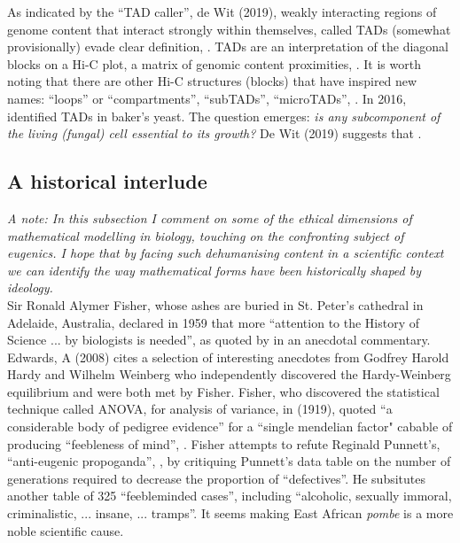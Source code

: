 As indicated by the ``TAD caller'', de Wit (2019), 
weakly interacting regions of genome content that interact strongly within themselves,
called TADs (somewhat provisionally) evade clear definition, \cite{de2020tads}.
TADs are an interpretation of the diagonal blocks on a Hi-C plot, a matrix of genomic 
content proximities, \cite{de2020tads}. It is worth noting that there are 
other Hi-C structures (blocks) that have inspired new names: ``loops'' or ``compartments'', ``subTADs'',
``microTADs'', \cite{beagan2020existence}. In 2016, \cite{eser2017form} identified TADs 
in baker's yeast. The question emerges: \textit{is any subcomponent of the living (fungal) cell essential to its
growth? } De Wit (2019) suggests that .

\subsection{A historical interlude}

\textit{A note: In this subsection I comment on 
some of the ethical dimensions of mathematical modelling in biology, 
touching on the confronting subject of eugenics. I hope that by facing 
such dehumanising content in a scientific context we 
can identify the way mathematical forms have been historically shaped by 
ideology.}
\\

Sir Ronald Alymer Fisher, whose ashes are buried in St. Peter's cathedral in Adelaide, Australia,
declared in 1959 that more ``attention to the History of Science ... by biologists is needed'',
as quoted by \cite{edwards2008gh} in an anecdotal commentary. Edwards, A (2008) cites
a selection of interesting anecdotes from Godfrey Harold Hardy and Wilhelm Weinberg who 
independently discovered the Hardy-Weinberg equilibrium and were both met by Fisher.
Fisher, who discovered the statistical technique called ANOVA, for analysis of variance, in 
\cite{fisher1919xv} (1919), quoted ``a considerable body of pedigree evidence'' for 
a ``single mendelian factor" cabable of producing ``feebleness of mind'', 
\cite{fisher1924elimination}. Fisher attempts to refute Reginald Punnett's, 
``anti-eugenic propoganda'', \cite{fisher1924elimination}, by critiquing
Punnett's data table on the number of generations required to decrease 
the proportion of ``defectives''. He subsitutes another table of 325 ``feebleminded cases'',
including ``alcoholic, sexually immoral, criminalistic, ... insane, ... tramps''.
It seems making East African \textit{pombe} is a more noble scientific cause.
\\

